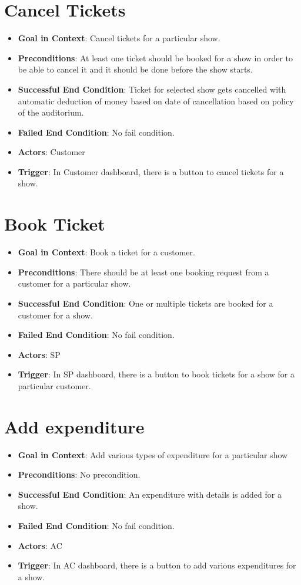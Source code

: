 \documentclass{scrreprt}
\begin{document}
\section{Cancel Tickets}
\begin{itemize}
\item \textbf{Goal in Context}: Cancel tickets for a particular show.
\item \textbf{Preconditions}: At least one ticket should be booked for a show in order to be able to cancel it and it should be done before the show starts. 
\item \textbf{Successful End Condition}: Ticket for selected show gets cancelled with automatic deduction of money based on date of cancellation based on policy of the auditorium.
\item \textbf{Failed End Condition}: No fail condition. 
\item \textbf{Actors}: Customer
\item \textbf{Trigger}: In Customer dashboard, there is a button to cancel tickets for a show.
\end{itemize}


\section{Book Ticket}
\begin{itemize}
\item \textbf{Goal in Context}: Book a ticket for a customer.
\item \textbf{Preconditions}: There should be at least one booking request from a customer for a particular show. 
\item \textbf{Successful End Condition}: One or multiple tickets are booked for a customer for a show.
\item \textbf{Failed End Condition}: No fail condition.
\item \textbf{Actors}: SP
\item \textbf{Trigger}: In SP dashboard, there is a button to book tickets for a show for a particular customer.
\end{itemize}


\section{Add expenditure}
\begin{itemize}
\item \textbf{Goal in Context}: Add various types of expenditure for a particular show
\item \textbf{Preconditions}: No precondition. 
\item \textbf{Successful End Condition}: An expenditure with details is added for a show.
\item \textbf{Failed End Condition}: No fail condition.
\item \textbf{Actors}: AC
\item \textbf{Trigger}: In AC dashboard, there is a button to add various expenditures for a show.
\end{itemize}
\end{document}
